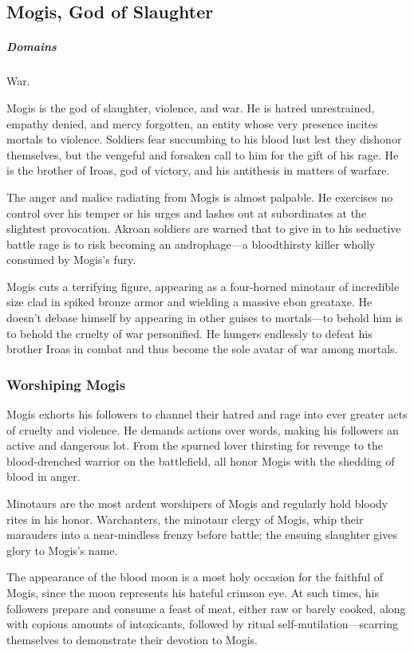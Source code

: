 \subsection*{Mogis, God of Slaughter} \label{ssec::mogis}
    \subparagraph{Domains} War.

    Mogis is the god of slaughter, violence, and war. He is hatred unrestrained, empathy denied, and mercy forgotten, an entity whose very presence incites mortals to violence. Soldiers fear succumbing to his blood lust lest they dishonor themselves, but the vengeful and forsaken call to him for the gift of his rage. He is the brother of Iroas, god of victory, and his antithesis in matters of warfare.

    The anger and malice radiating from Mogis is almost palpable. He exercises no control over his temper or his urges and lashes out at subordinates at the slightest provocation. Akroan soldiers are warned that to give in to his seductive battle rage is to risk becoming an androphage—a bloodthirsty killer wholly consumed by Mogis's fury.

    Mogis cuts a terrifying figure, appearing as a four-horned minotaur of incredible size clad in spiked bronze armor and wielding a massive ebon greataxe. He doesn't debase himself by appearing in other guises to mortals—to behold him is to behold the cruelty of war personified. He hungers endlessly to defeat his brother Iroas in combat and thus become the sole avatar of war among mortals.

    \subsubsection{Worshiping Mogis}
        Mogis exhorts his followers to channel their hatred and rage into ever greater acts of cruelty and violence. He demands actions over words, making his followers an active and dangerous lot. From the spurned lover thirsting for revenge to the blood-drenched warrior on the battlefield, all honor Mogis with the shedding of blood in anger.

        Minotaurs are the most ardent worshipers of Mogis and regularly hold bloody rites in his honor. Warchanters, the minotaur clergy of Mogis, whip their marauders into a near-mindless frenzy before battle; the ensuing slaughter gives glory to Mogis's name.

        The appearance of the blood moon is a most holy occasion for the faithful of Mogis, since the moon represents his hateful crimson eye. At such times, his followers prepare and consume a feast of meat, either raw or barely cooked, along with copious amounts of intoxicants, followed by ritual self-mutilation—scarring themselves to demonstrate their devotion to Mogis.

